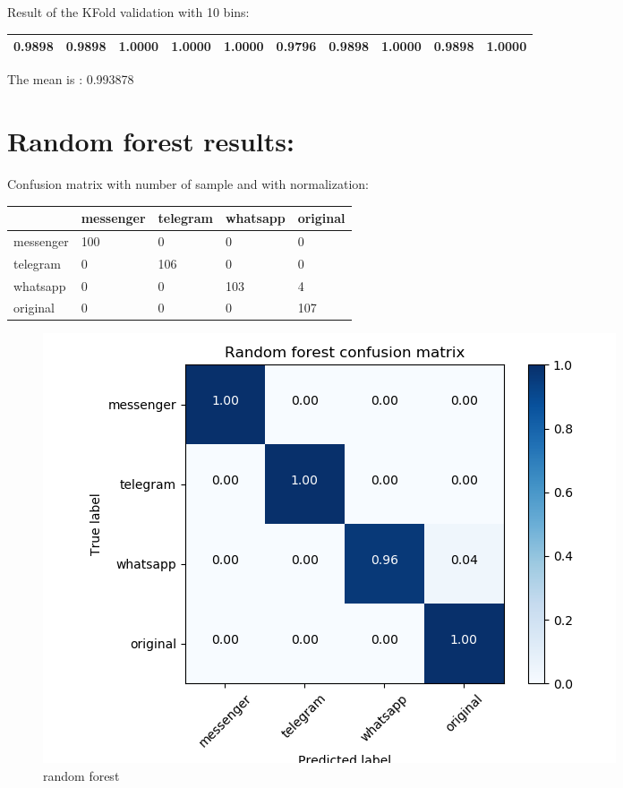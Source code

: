 Result of the KFold validation with 10 bins:
 {\def\arraystretch{1.3} 
 \begin{table}[H] 
\centering 
\begin{tabular}{|l |l |l |l |l |l |l |l |l |l |}  
\hline 
0.9898&
0.9898&
1.0000&
1.0000&
1.0000&
0.9796&
0.9898&
1.0000&
0.9898&
1.0000\\ \hline  

\end{tabular} 
\end{table} }

The mean is : 0.993878\section{Random forest results:}Confusion matrix with number of sample and with normalization:
 {\def\arraystretch{1.3} 
 \begin{table}[H] 
\centering 
\begin{tabular}{|l|l|l|l|l|} 
\hline 
  &messenger  &telegram  &whatsapp  &original  \\ \hline
messenger  &100  &0  &0  &0  \\ \hline
telegram  &0  &106  &0  &0  \\ \hline
whatsapp  &0  &0  &103  &4  \\ \hline
original  &0  &0  &0  &107  \\ \hline
\end{tabular} 
\end{table} }

 \begin{figure}[H] 
\centering 
\includegraphics[scale=.6]{images/rf_initial.png} 
\caption{random forest} 
\end{figure} 


